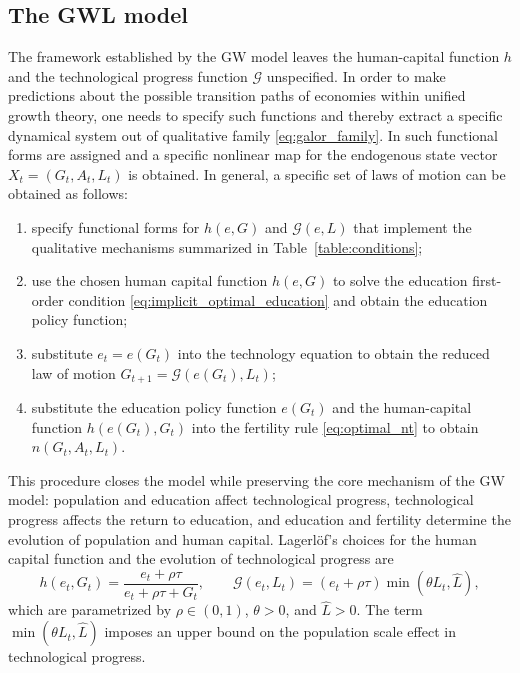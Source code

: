 \documentclass[a4paper,fleqn]{cas-sc}
\begin{document}
\subsection{The GWL model}\label{subsec:lagerlof_exercise}
The framework established by the GW model leaves the human-capital function $h$ and the technological progress function $\mathcal G$ unspecified. 
In order to make predictions about the possible transition paths of economies within unified growth theory, one needs to specify such functions and thereby extract a specific dynamical system out of qualitative family \eqref{eq:galor_family}.
In \citet{Lagerlof2006} such functional forms are assigned and a specific nonlinear map for the endogenous state vector $X_t=(G_t,A_t,L_t)$ is obtained. 
In general, a specific set of laws of motion can be obtained as follows: 
%
\begin{enumerate} 
    \item specify functional forms for $h(e,G)$ and $\mathcal G(e,L)$ that implement the qualitative mechanisms summarized in Table~\ref{table:conditions}; 
    \item use the chosen human capital function $h(e,G)$ to solve the education first-order condition \eqref{eq:implicit_optimal_education} and obtain the education policy function; 
    \item substitute $e_t=e(G_t)$ into the technology equation to obtain the reduced law of motion $G_{t+1} = \mathcal G(e(G_t),L_t)$; 
    \item substitute the education policy function $e(G_t)$ and the human-capital function $h(e(G_t),G_t)$ into the fertility rule \eqref{eq:optimal_nt} to obtain $n(G_t,A_t,L_t)$.
\end{enumerate} 
%
This procedure closes the model while preserving the core mechanism of the GW model: population and education affect technological progress, technological progress affects the return to education, and education and fertility determine the evolution of population and human capital.
Lagerl{\"o}f's choices for the human capital function and the evolution of technological progress are 
%
\begin{equation}\label{eq:lagerlof_choices} 
    h(e_t,G_t) = \frac{e_t+\rho\tau}{e_t+\rho\tau+G_t}, \qquad \mathcal G(e_t,L_t) = (e_t+\rho\tau)\min(\theta L_t,\hat L), 
\end{equation} 
%
which are parametrized by $\rho\in(0,1)$, $\theta>0$, and $\hat L>0$. The term $\min(\theta L_t,\hat L)$ imposes an upper bound on the population scale effect in technological progress. 
\end{document}
